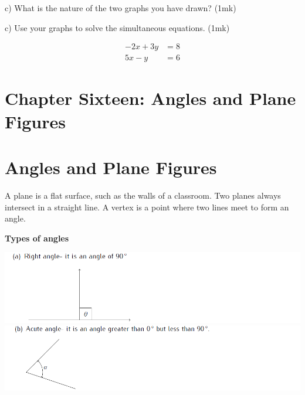\documentclass[
  a4paperpaper,
]{scrbook}
\begin{document}
\begin{tcolorbox}
\begin{enumerate}
  c) What is the nature of the two graphs you have drawn?
  \hspace{4.6cm}(1mk)

  c) Use your graphs to solve the simultaneous equations.
  \hspace{4.8 cm}(1mk)

  \begin{equation}
  \begin{split}
  -2x+3y&=8 \\
  5x-y&=6
  \end{split}
  \end{equation}
\end{enumerate}

\end{tcolorbox}


\chapter{Chapter Sixteen: Angles and Plane
Figures}\label{chapter-sixteen-angles-and-plane-figures}


\chapter*{Angles and Plane Figures}\label{angles-and-plane-figures}


A plane is a flat surface, such as the walls of a classroom. Two planes
always intersect in a straight line. A vertex is a point where two lines
meet to form an angle.

\textbf{Types of angles}

\includegraphics{images/Cpt15_anglesa.png}
\includegraphics{images/Cpt15_anglesb.png}
\end{document}
